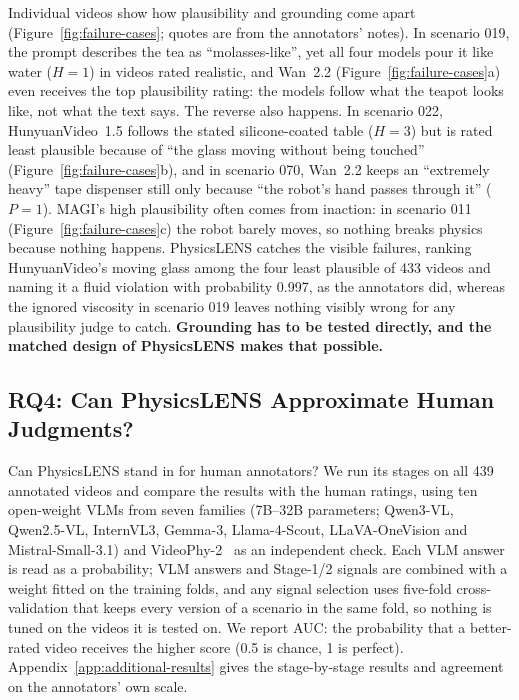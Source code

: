 Individual videos show how plausibility and grounding come apart (Figure~\ref{fig:failure-cases}; quotes are from the annotators' notes). In scenario 019, the prompt describes the tea as ``molasses-like'', yet all four models pour it like water ($H{=}1$) in videos rated realistic, and Wan~2.2 (Figure~\ref{fig:failure-cases}a) even receives the top plausibility rating: the models follow what the teapot looks like, not what the text says. The reverse also happens. In scenario 022, HunyuanVideo~1.5 follows the stated silicone-coated table ($H{=}3$) but is rated least plausible because of ``the glass moving without being touched'' (Figure~\ref{fig:failure-cases}b), and in scenario 070, Wan~2.2 keeps an ``extremely heavy'' tape dispenser still only because ``the robot's hand passes through it'' ($P{=}1$). MAGI's high plausibility often comes from inaction: in scenario 011 (Figure~\ref{fig:failure-cases}c) the robot barely moves, so nothing breaks physics because nothing happens. PhysicsLENS catches the visible failures, ranking HunyuanVideo's moving glass among the four least plausible of 433 videos and naming it a fluid violation with probability 0.997, as the annotators did, whereas the ignored viscosity in scenario 019 leaves nothing visibly wrong for any plausibility judge to catch. \textbf{Grounding has to be tested directly, and the matched design of PhysicsLENS makes that possible.}

\subsection{RQ4: Can PhysicsLENS Approximate Human Judgments?}
\label{sec:results-tool}

Can PhysicsLENS stand in for human annotators? We run its stages on all 439 annotated videos and compare the results with the human ratings, using ten open-weight VLMs from seven families (7B--32B parameters; Qwen3-VL, Qwen2.5-VL, InternVL3, Gemma-3, Llama-4-Scout, LLaVA-OneVision and Mistral-Small-3.1) and VideoPhy-2~\citep{bansal2026videophy} as an independent check. Each VLM answer is read as a probability; VLM answers and Stage-1/2 signals are combined with a weight fitted on the training folds, and any signal selection uses five-fold cross-validation that keeps every version of a scenario in the same fold, so nothing is tuned on the videos it is tested on. We report AUC: the probability that a better-rated video receives the higher score (0.5 is chance, 1 is perfect). Appendix~\ref{app:additional-results} gives the stage-by-stage results and agreement on the annotators' own scale.

